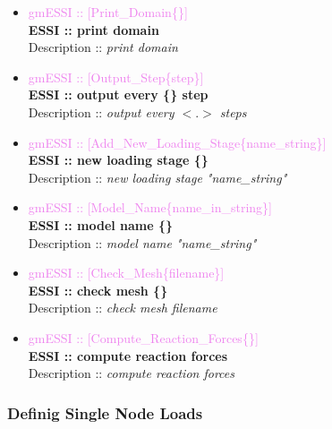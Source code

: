 \documentclass[11pt]{article}
\begin{document}
\begin{itemize}
      \item \textcolor{violet} {gmESSI :: [Print\_Domain\{\}]}\\
      \textbf{ESSI :: print domain}\\
      Description :: \textit{print domain}

      \item \textcolor{violet} {gmESSI :: [Output\_Step\{step\}]}\\
      \textbf{ESSI :: output every \{\} step}\\
      Description :: \textit{output every $<.>$ steps}

      \item \textcolor{violet} {gmESSI :: [Add\_New\_Loading\_Stage\{name\_string\}]}\\
      \textbf{ESSI :: new loading stage \{\}}\\
      Description :: \textit{new loading stage "name\_string"}

      \item \textcolor{violet} {gmESSI :: [Model\_Name\{name\_in\_string\}]}\\
      \textbf{ESSI :: model name \{\}}\\
      Description :: \textit{model name "name\_string"}

      \item \textcolor{violet} {gmESSI :: [Check\_Mesh\{filename\}]}\\
      \textbf{ESSI :: check mesh \{\}}\\
      Description :: \textit{check mesh filename}

      \item \textcolor{violet} {gmESSI :: [Compute\_Reaction\_Forces\{\}]}\\
      \textbf{ESSI :: compute reaction forces }\\
      Description :: \textit{compute reaction forces}

  \end{itemize}

\subsubsection{Definig Single Node Loads}
\end{document}
